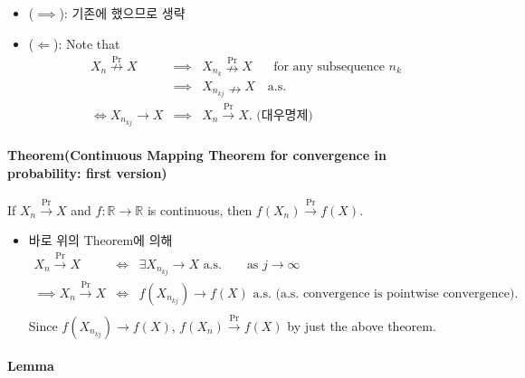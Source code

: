 \documentclass[]{article}
\providecommand{\tightlist}{%
  \setlength{\itemsep}{0pt}\setlength{\parskip}{0pt}}
\let\oldparagraph\paragraph
\renewcommand{\paragraph}[1]{\oldparagraph{#1}\mbox{}}
\begin{document}
\begin{itemize}
\item
  (\(\implies\)): 기존에 했으므로 생략
\item
  (\(\Longleftarrow\)): Note that \[\begin{eqnarray*}
     X_n \stackrel{\text{Pr}}\nrightarrow X&\implies& X_{n_k} \stackrel{\text{Pr}}\nrightarrow X\mbox{ }\mbox{ }\mbox{ for any subsequence }n_k\\
    &\implies& X_{n_{kj}}\nrightarrow X \mbox{ }\mbox{ a.s.}\\
     \iff     X_{n_{kj}}\rightarrow X &\implies&   X_n\stackrel{\text{Pr}}\rightarrow X.\mbox{ (대우명제)}
     \end{eqnarray*}\]
\end{itemize}

\hypertarget{theoremcontinuous-mapping-theorem-for-convergence-in-probability-first-version}{%
\paragraph{Theorem(Continuous Mapping Theorem for convergence in
probability: first
version)}\label{theoremcontinuous-mapping-theorem-for-convergence-in-probability-first-version}}

If \(X_n\stackrel{\text{Pr}}\rightarrow X\) and
\(f:\mathbb{R}\rightarrow\mathbb{R}\) is continuous, then
\(f(X_n)\stackrel{\text{Pr}}\rightarrow f(X)\).

\begin{itemize}
\tightlist
\item
  바로 위의 Theorem에 의해 \[\begin{eqnarray*}
     X_n\stackrel{\text{Pr}}\rightarrow X &\iff& \exists X_{n_{kj}}\rightarrow X \mbox{ a.s. }\mbox{ }\mbox{ }\mbox{ as }j\rightarrow \infty \\
     \implies   X_n\stackrel{\text{Pr}}\rightarrow X &\iff& f(X_{n_{kj}})\rightarrow f(X) \mbox{ a.s. } \mbox{(a.s. convergence is pointwise convergence)}. \\
     \end{eqnarray*}\] Since \(f(X_{n_{kj}})\rightarrow f(X)\),
  \(f(X_n)\stackrel{\text{Pr}}\rightarrow f(X)\) by just the above
  theorem.
\end{itemize}

\hypertarget{lemma}{%
\paragraph{Lemma}\label{lemma}}
\end{document}
